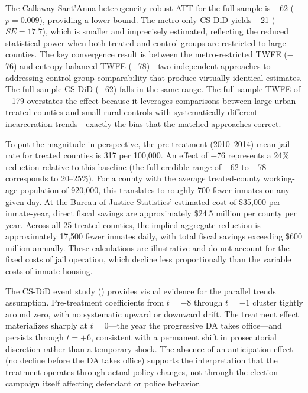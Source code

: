 \documentclass[12pt]{article}
\begin{document}
The Callaway-Sant'Anna heterogeneity-robust ATT for the full sample is $-$62 ($p = 0.009$), providing a lower bound. The metro-only CS-DiD yields $-$21 ($SE = 17.7$), which is smaller and imprecisely estimated, reflecting the reduced statistical power when both treated and control groups are restricted to large counties. The key convergence result is between the metro-restricted TWFE ($-$76) and entropy-balanced TWFE ($-$78)---two independent approaches to addressing control group comparability that produce virtually identical estimates. The full-sample CS-DiD ($-$62) falls in the same range. The full-sample TWFE of $-$179 overstates the effect because it leverages comparisons between large urban treated counties and small rural controls with systematically different incarceration trends---exactly the bias that the matched approaches correct.



To put the magnitude in perspective, the pre-treatment (2010--2014) mean jail rate for treated counties is 317 per 100,000. An effect of $-$76 represents a 24\% reduction relative to this baseline (the full credible range of $-$62 to $-$78 corresponds to 20--25\%). For a county with the average treated-county working-age population of 920,000, this translates to roughly 700 fewer inmates on any given day. At the Bureau of Justice Statistics' estimated cost of \$35,000 per inmate-year, direct fiscal savings are approximately \$24.5 million per county per year. Across all 25 treated counties, the implied aggregate reduction is approximately 17,500 fewer inmates daily, with total fiscal savings exceeding \$600 million annually. These calculations are illustrative and do not account for the fixed costs of jail operation, which decline less proportionally than the variable costs of inmate housing.

The CS-DiD event study () provides visual evidence for the parallel trends assumption. Pre-treatment coefficients from $t = -8$ through $t = -1$ cluster tightly around zero, with no systematic upward or downward drift. The treatment effect materializes sharply at $t = 0$---the year the progressive DA takes office---and persists through $t = +6$, consistent with a permanent shift in prosecutorial discretion rather than a temporary shock. The absence of an anticipation effect (no decline before the DA takes office) supports the interpretation that the treatment operates through actual policy changes, not through the election campaign itself affecting defendant or police behavior.
\end{document}
